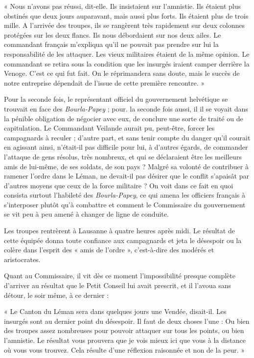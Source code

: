 \documentclass[french,twoside]{book} %
\newenvironment{quoteblock}%
  {\begin{quoting}}
  {\end{quoting}}
\newenvironment{quotebar}{%
    \def\FrameCommand{{\color{rubric!10!}\vrule width 0.5em} \hspace{0.9em}}%
    \def\OuterFrameSep{\itemsep} %
    \MakeFramed {\advance\hsize-\width \FrameRestore}
  }%
  {%
    \endMakeFramed
  }
\renewenvironment{quoteblock}%
  {%
    \savenotes
    \setstretch{0.9}
    \begin{quotebar}
  }
  {%
    \end{quotebar}
    \spewnotes
  }
\begin{document}
\begin{quoteblock}
 \noindent « Nous n’avons pas réussi, dit-elle. Ils insistaient sur l’amnistie. Ils étaient plus obstinés que deux jours auparavant, mais aussi plus forts. Ils étaient plus de trois mille. A l’arrivée des troupes, ils se rangèrent très rapidement sur deux colonnes protégées sur les deux flancs. Ils nous débordaient sur nos deux ailes. Le commandant français m’expliqua qu’il ne pouvait pas prendre sur lui la responsabilité de les attaquer. Les vieux militaires étaient de la même opinion. Le commandant se retira sous la condition que les insurgés iraient camper derrière la Venoge. C’est ce qui fut fait. On le réprimandera sans doute, mais le succès de notre entreprise dépendait de l’issue de cette première rencontre. »
 \end{quoteblock}

\noindent Pour la seconde fois, le représentant officiel du gouvernement helvétique se trouvait en face des \emph{Bourla-Papey} ; pour. la seconde fois aussi, il il se voyait dans la pénible obligation de négocier avec eux, de conclure une sorte de traité ou de capitulation. Le Commandant Veilande aurait pu, peut-être, forcer les campagnards à reculer ; d’autre part, et sans tenir compte du danger qu’il courait en agissant ainsi, n’était-il pas difficile pour lui, à d’autres égards, de commander l’attaque de gens résolus, très nombreux, et qui se déclaraient être les meilleurs amis de lui-même, de ses soldats, de son pays ? Malgré sa volonté de contribuer à ramener l’ordre dans le Léman, ne devait-il pas désirer que le conflit s’apaisât par d’autres moyens que ceux de la force militaire ? On voit dans ce fait en quoi consista surtout l’habileté des \emph{Bourla-Papey}, ce qui amena les officiers français à s’interposer plutôt qu’à combattre et comment le Commissaire du gouvernement se vit peu à peu amené à changer de ligne de conduite.\par
Les troupes rentrèrent à Lausanne à quatre heures après midi. Le résultat de cette équipée donna toute confiance aux campagnards et jeta le désespoir ou la colère dans l’esprit des « amis de l’ordre », c’est-à-dire des modérés et aristocrates.\par
Quant au Commissaire, il vit dès ce moment l’impossibilité presque complète d’arriver au résultat que le Petit Conseil lui avait prescrit, et il l’avoua sans détour, le soir même, à ce dernier :\par

\begin{quoteblock}
 \noindent « Le Canton du Léman sera dans quelques jours une Vendée, disait-il. Les insurgés sont au dernier point du désespoir. Il faut de deux choses l’une : Ou bien des troupes assez nombreuses pour pouvoir attaquer sur tous les points, ou bien l’amnistie. Le résultat vous prouvera que je vois mieux ici que vous à la distance où vous vous trouvez. Cela résulte d’une réflexion raisonnée et non de la peur. »
 \end{quoteblock}
\end{document}
